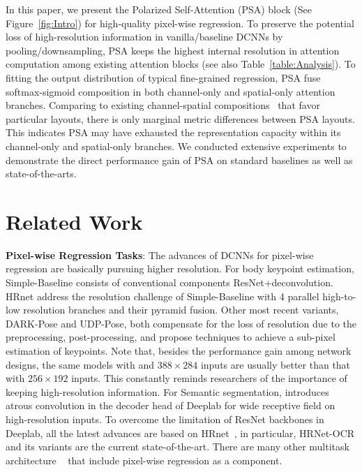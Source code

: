 \documentclass[10pt,twocolumn,letterpaper]{article}
\begin{document}
In this paper, we present the Polarized Self-Attention (PSA) block (See Figure~\ref{fig:Intro}) for high-quality pixel-wise regression. To preserve the potential loss of high-resolution information in vanilla/baseline DCNNs by pooling/downsampling, PSA keeps the highest internal resolution in attention computation among existing attention blocks (see also Table~\ref{table:Analysis}). To fitting the output distribution of typical fine-grained regression, PSA fuse softmax-sigmoid composition in both channel-only and spatial-only attention branches. Comparing to existing channel-spatial compositions~\cite{Sanghyun2018cbam,Fu2019} that favor particular layouts, there is only marginal metric differences between PSA layouts. This indicates PSA may have exhausted the representation capacity within its channel-only and spatial-only branches. We conducted extensive experiments to demonstrate the direct performance gain of PSA on standard baselines as well as state-of-the-arts.  



\section{Related Work}

\textbf{Pixel-wise Regression Tasks}: The advances of DCNNs for pixel-wise regression are basically pursuing higher resolution. For body keypoint estimation, Simple-Baseline\cite{Xiao18} consists of conventional components ResNet+deconvolution. HRnet\cite{Sun2019} address the resolution challenge of Simple-Baseline with 4 parallel high-to-low resolution branches and their pyramid fusion. Other most recent variants, DARK-Pose\cite{Zhang2020} and UDP-Pose\cite{Huang2020}, both compensate for the loss of resolution due to the preprocessing, post-processing, and propose techniques to achieve a sub-pixel estimation of keypoints.  Note that, besides the performance gain among network designs, the same models with and $388\times 284$ inputs are usually better than that with $256\times 192$ inputs. This constantly reminds researchers of the importance of keeping high-resolution information. For Semantic segmentation, \cite{Chen17} introduces atrous convolution in the decoder head of Deeplab for wide receptive field on high-resolution inputs. To overcome the limitation of ResNet backbones in Deeplab, all the latest advances are based on HRnet~\cite{Wang2020}, in particular, HRNet-OCR\cite{Tao2020} and its variants are the current state-of-the-art. There are many other multitask architecture ~\cite{He17,zhou2019objects,cheng2020panoptic} that include pixel-wise regression as a component. 
\end{document}
